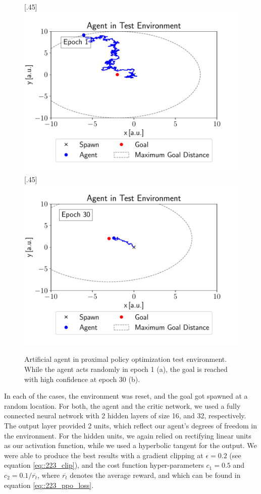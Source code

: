 \begin{figure}[h!]
	\centering
	[.45\linewidth]{\includegraphics[scale=.45]{chapters/04_experiments/02_autonomous_walking/epoch_1.pdf}}	
	[.45\linewidth]{\includegraphics[scale=.45]{chapters/04_experiments/02_autonomous_walking/epoch_30.pdf}}
	\caption{Artificial agent in proximal policy optimization test environment. While the agent acts randomly in epoch 1 (a), the goal is reached with high confidence at epoch 30 (b).}	
	\label{fig::431_ppo_env}
\end{figure} 
In each of the cases, the environment was reset, and the goal got spawned at a random location. For both, the agent and the critic network, we used a fully connected neural network with 2 hidden layers of size 16, and 32, respectively. The output layer provided 2 units, which reflect our agent's degrees of freedom in the environment. For the hidden units, we again relied on rectifying linear units as our activation function, while we used a hyperbolic tangent for the output. We were able to produce the best results with a gradient clipping at $\epsilon=0.2$ (see equation \ref{eq::223_clip}), and the cost function hyper-parameters $c_1 = 0.5$ and $c_2 = 0.1/\overline{r_t}$, where $\overline{r_t}$ denotes the average reward, and which can be found in equation \ref{eq::223_ppo_loss}. 
